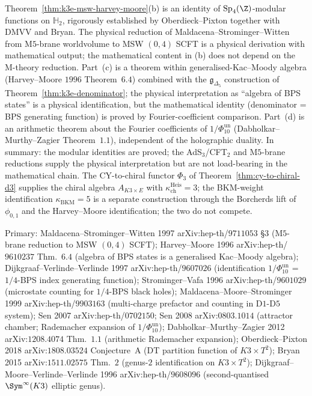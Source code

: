 \begin{remark}
\label{rem:k3e-holographic-epistemic-scope}
Theorem~\ref{thm:k3e-msw-harvey-moore}(b) is an identity of $\mathrm{Sp}_4(\Z)$-modular functions on $\mathbb{H}_2$, rigorously established by Oberdieck--Pixton together with DMVV and Bryan. The physical reduction of Maldacena--Strominger--Witten from M$5$-brane worldvolume to MSW $(0, 4)$ SCFT is a physical derivation with mathematical output; the mathematical content in (b) does not depend on the M-theory reduction. Part~(c) is a theorem within generalised-Kac--Moody algebra (Harvey--Moore $1996$ Theorem~$6.4$) combined with the $\mathfrak{g}_{\Delta_5}$ construction of Theorem~\ref{thm:k3e-denominator}; the physical interpretation as ``algebra of BPS states'' is a physical identification, but the mathematical identity (denominator = BPS generating function) is proved by Fourier-coefficient comparison. Part~(d) is an arithmetic theorem about the Fourier coefficients of \(1/\Phi_{10}^{\mathrm{un}}\) (Dabholkar--Murthy--Zagier Theorem~$1.1$), independent of the holographic duality. In summary: the modular identities are proved; the AdS$_{3}$/CFT$_{2}$ and M$5$-brane reductions supply the physical interpretation but are not load-bearing in the mathematical chain. The CY-to-chiral functor $\Phi_3$ of Theorem~\ref{thm:cy-to-chiral-d3} supplies the chiral algebra $A_{K3\times E}$ with $\kappa_{\mathrm{ch}}^{\mathrm{Heis}} = 3$; the BKM-weight identification $\kappa_{\mathrm{BKM}} = 5$ is a separate construction through the Borcherds lift of $\phi_{0,1}$ and the Harvey--Moore identification; the two do not compete.
\end{remark}

\begin{remark}
\label{rem:k3e-msw-harvey-moore-primary-literature}
Primary:
Maldacena--Strominger--Witten 1997 arXiv:hep-th/$9711053$ \S$3$
(M$5$-brane reduction to MSW $(0, 4)$ SCFT);
Harvey--Moore 1996 arXiv:hep-th/$9610237$ Thm.~$6.4$
(algebra of BPS states is a generalised Kac--Moody algebra);
Dijkgraaf--Verlinde--Verlinde 1997 arXiv:hep-th/$9607026$
(identification \(1/\Phi_{10}^{\mathrm{un}}\) = $1/4$-BPS index generating function);
Strominger--Vafa 1996 arXiv:hep-th/$9601029$
(microstate counting for $1/4$-BPS black holes);
Maldacena--Moore--Strominger 1999 arXiv:hep-th/$9903163$
(multi-charge prefactor and counting in D$1$-D$5$ system);
Sen 2007 arXiv:hep-th/$0702150$; Sen 2008 arXiv:$0803.1014$
(attractor chamber; Rademacher expansion of \(1/\Phi_{10}^{\mathrm{un}}\));
Dabholkar--Murthy--Zagier 2012 arXiv:$1208.4074$ Thm.~$1.1$
(arithmetic Rademacher expansion);
Oberdieck--Pixton 2018 arXiv:$1808.03524$ Conjecture~A
(DT partition function of $K3\times T^{2}$);
Bryan 2015 arXiv:$1511.02575$ Thm.~$2$
(genus-$2$ identification on $K3\times T^{2}$);
Dijkgraaf--Moore--Verlinde--Verlinde 1996
arXiv:hep-th/$9608096$
(second-quantised $\Sym^{\infty}(K3)$ elliptic genus).
\end{remark}


